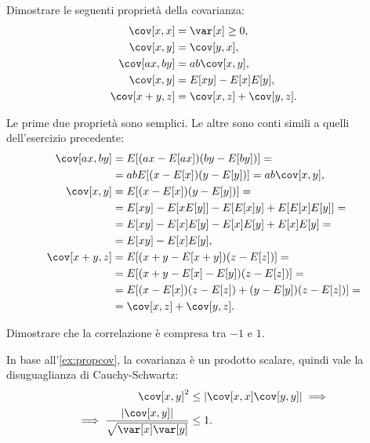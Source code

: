 \begin{exercise}\label{ex:propcov}
    Dimostrare le seguenti proprietà della covarianza:
	\begin{align*}
        \cov[x,x] &= \var[x] \ge 0, \\
        \cov[x,y] &= \cov[y,x], \\
		\cov[ax,by] &= ab\cov[x,y], \\
		\cov[x,y] &= E[xy] - E[x]E[y], \\
		\cov[x+y,z] &= \cov[x,z] + \cov[y,z].
	\end{align*}
\end{exercise}

\begin{solution}
    Le prime due proprietà sono semplici. Le altre sono conti simili a quelli
    dell'esercizio precedente:
    \begin{align*}
        \cov[ax,by] &= E[(ax - E[ax])(by - E[by])] = \\
        &= abE[(x - E[x])(y - E[y])]
        = ab\cov[x,y], \\
        \cov[x,y] &= E[(x - E[x])(y - E[y])] = \\
        &= E[xy] - E[xE[y]] - E[E[x]y] + E[E[x]E[y]] = \\
        &= E[xy] - E[x]E[y] - E[x]E[y] + E[x]E[y] = \\
        &= E[xy] - E[x]E[y], \\
        \cov[x+y,z] &= E[(x+y - E[x+y])(z - E[z])] = \\
        &= E[(x+y-E[x]-E[y])(z - E[z])] = \\
        &= E[(x - E[x])(z - E[z]) + (y - E[y])(z - E[z])] = \\
        &= \cov[x,z] + \cov[y,z].
    \end{align*}
\end{solution}

\begin{exercise} \label{ex:corrbound}
    Dimostrare che la correlazione è compresa tra $-1$ e $1$.
\end{exercise}

\begin{solution}
    In base all'\autoref{ex:propcov}, la covarianza è un prodotto scalare,
    quindi vale la disuguaglianza di Cauchy-Schwartz:
    \begin{align*}
        \cov[x, y]^2 &\le |\cov[x, x]\cov[y, y]| \implies \\
        \implies \frac{|\cov[x, y]|}{\sqrt{\var[x]\var[y]}} &\le 1.
    \end{align*}
\end{solution}

